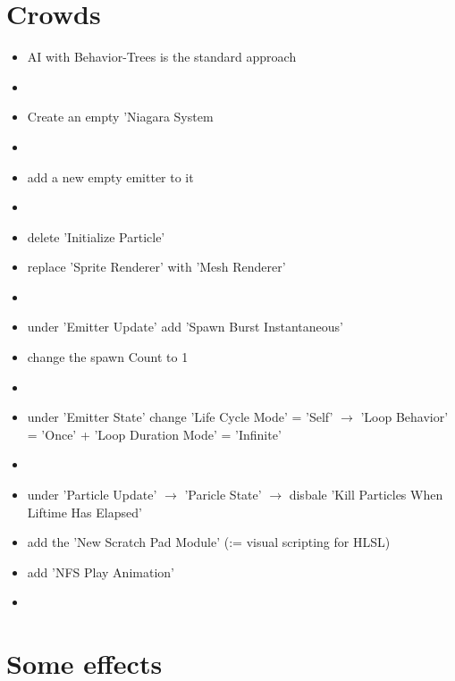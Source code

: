     \section{Crowds}
        \begin{itemize}
            \item AI with Behavior-Trees is the standard approach
            \item 
            \item Create an empty 'Niagara System
            \item 
            \item add a new empty emitter to it
            \item 
            \item delete 'Initialize Particle'
            \item replace 'Sprite Renderer' with 'Mesh Renderer'
            \item 
            \item under 'Emitter Update' add 'Spawn Burst Instantaneous'
            \item change the spawn Count to 1
            \item 
            \item under 'Emitter State' change 'Life Cycle Mode' = 'Self' $\rightarrow$ 'Loop Behavior' = 'Once' + 'Loop Duration Mode' = 'Infinite'
            \item 
            \item under 'Particle Update' $\rightarrow$ 'Paricle State' $\rightarrow$ disbale 'Kill Particles When Liftime Has Elapsed'
            \item add the 'New Scratch Pad Module' (:= visual scripting for HLSL)
            \item add 'NFS Play Animation'
            \item 
        \end{itemize}


    \section{Some effects}
